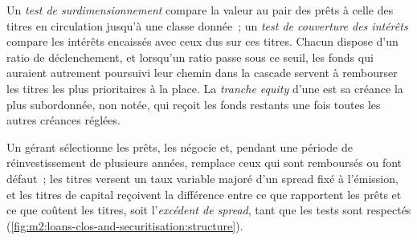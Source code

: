 \begin{definition}\label{def:m2:loans-clos-and-securitisation:tests}
Un \emph{test de surdimensionnement} compare la
valeur au pair des prêts à celle des titres en circulation jusqu'à une classe donnée~; un
\emph{test de couverture des intérêts} compare les intérêts
encaissés avec ceux dus sur ces titres. Chacun dispose d'un ratio de déclenchement, et lorsqu'un
ratio passe sous ce seuil, les fonds qui auraient autrement poursuivi leur chemin dans la cascade servent à rembourser les
titres les plus prioritaires à la place. La \emph{tranche equity}
d'une  est sa créance la plus subordonnée, non notée, qui reçoit les fonds restants
une fois toutes les autres créances réglées.
\end{definition}

Un gérant sélectionne les prêts, les négocie et, pendant une période de réinvestissement de plusieurs
années, remplace ceux qui sont remboursés ou font défaut~; les titres versent un taux variable
majoré d'un spread fixé à l'émission, et les titres de capital reçoivent la différence entre ce que
rapportent les prêts et ce que coûtent les titres, soit l'\emph{excédent de spread}, tant que les tests sont
respectés (\cref{fig:m2:loans-clos-and-securitisation:structure}).

